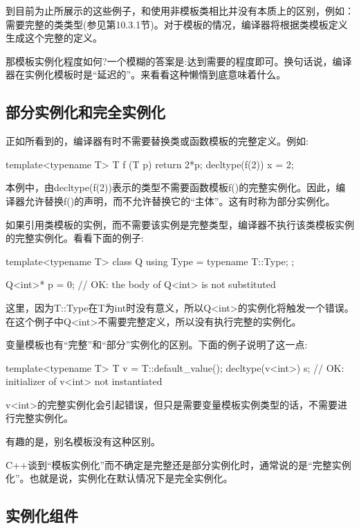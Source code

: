 
到目前为止所展示的这些例子，和使用非模板类相比并没有本质上的区别，例如：需要完整的类类型(参见第10.3.1节)。对于模板的情况，编译器将根据类模板定义生成这个完整的定义。

那模板实例化程度如何?一个模糊的答案是:达到需要的程度即可。换句话说，编译器在实例化模板时是“延迟的”。来看看这种懒惰到底意味着什么。

\subsection{部分实例化和完全实例化}

正如所看到的，编译器有时不需要替换类或函数模板的完整定义。例如:

\begin{cpp}
template<typename T> T f (T p) { return 2*p; }
decltype(f(2)) x = 2;
\end{cpp}

本例中，由decltype(f(2))表示的类型不需要函数模板f()的完整实例化。因此，编译器允许替换f()的声明，而不允许替换它的“主体”。这有时称为部分实例化。

如果引用类模板的实例，而不需要该实例是完整类型，编译器不执行该类模板实例的完整实例化。看看下面的例子:

\begin{cpp}
template<typename T> class Q {
	using Type = typename T::Type;
};

Q<int>* p = 0; // OK: the body of Q<int> is not substituted
\end{cpp}

这里，因为T::Type在T为int时没有意义，所以Q<int>的实例化将触发一个错误。在这个例子中Q<int>不需要完整定义，所以没有执行完整的实例化。

变量模板也有“完整”和“部分”实例化的区别。下面的例子说明了这一点:

\begin{cpp}
template<typename T> T v = T::default_value();
decltype(v<int>) s; // OK: initializer of v<int> not instantiated
\end{cpp}

v<int>的完整实例化会引起错误，但只是需要变量模板实例类型的话，不需要进行完整实例化。

有趣的是，别名模板没有这种区别。

C++谈到“模板实例化”而不确定是完整还是部分实例化时，通常说的是“完整实例化”。也就是说，实例化在默认情况下是完全实例化。

\subsection{实例化组件}

